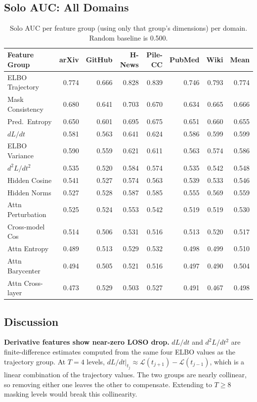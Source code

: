 \subsection{Solo AUC: All Domains}

\begin{table}[h]
\centering
\caption{Solo AUC per feature group (using only that group's dimensions) per domain.
         Random baseline is 0.500.}
\label{tab:solo_full}
\small
\begin{tabular}{l rrrrrr r}
\toprule
\textbf{Feature Group} & arXiv & GitHub & H-News & Pile-CC & PubMed & Wiki & Mean \\
\midrule
ELBO Trajectory   & 0.774 & 0.666 & 0.828 & 0.839 & 0.746 & 0.793 & 0.774 \\
Mask Consistency  & 0.680 & 0.641 & 0.703 & 0.670 & 0.634 & 0.665 & 0.666 \\
Pred.\ Entropy    & 0.650 & 0.601 & 0.695 & 0.675 & 0.651 & 0.660 & 0.655 \\
$dL/dt$           & 0.581 & 0.563 & 0.641 & 0.624 & 0.586 & 0.599 & 0.599 \\
ELBO Variance     & 0.590 & 0.559 & 0.621 & 0.611 & 0.563 & 0.574 & 0.586 \\
$d^2L/dt^2$       & 0.535 & 0.520 & 0.584 & 0.574 & 0.535 & 0.542 & 0.548 \\
Hidden Cosine     & 0.541 & 0.527 & 0.574 & 0.563 & 0.539 & 0.533 & 0.546 \\
Hidden Norms      & 0.527 & 0.528 & 0.587 & 0.585 & 0.555 & 0.569 & 0.559 \\
Attn Perturbation & 0.525 & 0.524 & 0.553 & 0.542 & 0.519 & 0.519 & 0.530 \\
Cross-model Cos   & 0.514 & 0.506 & 0.531 & 0.516 & 0.513 & 0.520 & 0.517 \\
Attn Entropy      & 0.489 & 0.513 & 0.529 & 0.532 & 0.498 & 0.499 & 0.510 \\
Attn Barycenter   & 0.494 & 0.505 & 0.521 & 0.516 & 0.497 & 0.490 & 0.504 \\
Attn Cross-layer  & 0.473 & 0.529 & 0.503 & 0.527 & 0.491 & 0.467 & 0.498 \\
\bottomrule
\end{tabular}
\end{table}

\subsection{Discussion}

\textbf{Derivative features show near-zero LOSO drop.}
$dL/dt$ and $d^2L/dt^2$ are finite-difference estimates computed from the same four ELBO
values as the trajectory group. At $T=4$ levels, $dL/dt|_{t_j} \approx \mathcal{L}(t_{j+1})
- \mathcal{L}(t_{j-1})$, which is a linear combination of the trajectory values.
The two groups are nearly collinear, so removing either one leaves the other to compensate.
Extending to $T \geq 8$ masking levels would break this collinearity.

